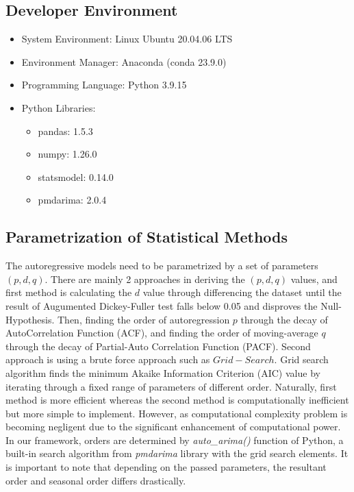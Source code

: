 \documentclass[]{usiinfbachelorproject}
\begin{document}
\subsection{Developer Environment}
\begin{itemize}
 \item System Environment: Linux Ubuntu 20.04.06 LTS
 \item Environment Manager: Anaconda (conda 23.9.0)
 \item Programming Language: Python 3.9.15
 \item Python Libraries: 
 \begin{itemize}
    \item pandas: 1.5.3
    \item numpy: 1.26.0
    \item statsmodel: 0.14.0
    \item pmdarima: 2.0.4
 \end{itemize}
\end{itemize}

\subsection{Parametrization of Statistical Methods}
The autoregressive models need to be parametrized by a set of parameters ${(p, d, q)}$. There are mainly 2 approaches in deriving the ${(p,d,q)}$ values, and first method is calculating the $d$ value through differencing the dataset until the result of Augumented Dickey-Fuller test falls below 0.05 and disproves the Null-Hypothesis.
Then, finding the order of autoregression $p$ through the decay
of AutoCorrelation Function (ACF), and finding the order of moving-average $q$ through the decay of Partial-Auto Correlation Function (PACF). Second approach is using a brute force approach such as $Grid-Search$. Grid search algorithm finds the minimum Akaike Information Criterion (AIC) value by iterating through a fixed range of parameters of different order. Naturally, first method is more efficient whereas the second method is computationally inefficient but more simple to implement. However, as computational complexity problem is becoming negligent due to the significant enhancement of computational power. In our framework, orders are determined by \textit{auto\_arima()} function of Python, a built-in search algorithm from \textit{pmdarima} library with the grid search elements. It is important to note that depending on the passed parameters, the resultant order and seasonal order differs drastically. \\
\end{document}
